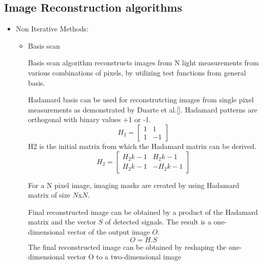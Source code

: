 \documentclass[conference]{IEEEtran}
\begin{document}
\subsection{Image Reconstruction algorithms}
\begin{itemize}
\item Non Iterative Methods:
    \begin{itemize}
        \item Basis scan
        \smallskip
        \par Basis scan algorithm reconstructs images from N light measurements from various combinations of pixels, by utilizing test functions from general basis.
        \par
        Hadamard basis can be used for reconstrutcting images from single pixel measurements as demonstrated by Duarte et al.[]. Hadamard patterns  are orthogonal with binary values +1 or -1. 
        \begin{equation}
            H_{2}=\begin{bmatrix}
            1&1 \\ 
            1&-1 
            \end{bmatrix}
        \end{equation}
            H2 is the initial matrix from which the Hadamard matrix can be derived. 
        \begin{equation}
            H_{2}=\begin{bmatrix}
            H_{2}k-1&H_{2}k-1 \\ 
            H_{2}k-1&-H_{2}k-1 
            \end{bmatrix}
        \end{equation}    
        \par For a N pixel image, imaging masks are created by using Hadamard matrix of size $N$x$N$.\par Final reconstructed image can be obtained by a product of the Hadamard matrix and the vector $S$ of detected signals. The result is a one-dimensional vector of the output image $O$.
        \begin{equation}
            O=H.S
        \end{equation} 
        The final reconstructed image can be obtained by reshaping the one-dimensional vector O to a two-dimensional image
        

\end{itemize}
\end{itemize}
\end{document}
